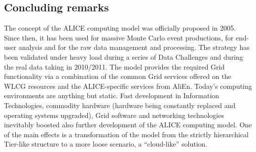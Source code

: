 \subsection{Concluding remarks}
%
The concept of the ALICE computing model was officially proposed in
2005. Since then, it has been used for massive Monte Carlo event
productions, for end-user analysis and for the raw data management
and processing. The strategy has been validated under heavy load
during a series of Data Challenges and during the real data taking
in 2010/2011. The model provides the required Grid functionality via
a combination of the common Grid services offered on the WLCG
resources and the ALICE-specific services from AliEn. Today's
computing environments are anything but static. Fast development in
Information Technologies, commodity hardware (hardware being
constantly replaced and operating systems upgraded), Grid software
and networking technologies inevitably boosted also further
development of the ALICE computing model. One of the main effects is
a transformation of the model from the strictly hierarchical
Tier-like structure to a more loose scenario, a ``cloud-like''
solution.
